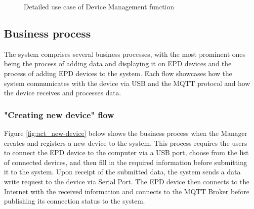 \documentclass[../Main.tex]{subfiles}
\begin{document}
\begin{figure}[H]
    \centering
    \caption{Detailed use case of Device Management function}
    \label{fig:uc_device}
\end{figure}

\subsection{Business process}
\label{subsection:2.2.3}
The system comprises several business processes, with the most prominent ones being the process of adding data and displaying it on EPD devices and the process of adding EPD devices to the system. Each flow showcases how the system communicates with the device via USB and the MQTT protocol and how the device receives and processes data.

\subsubsection{"Creating new device" flow}
Figure \ref{fig:act_new-device} below shows the business process when the Manager creates and registers a new device to the system. This process requires the users to connect the EPD device to the computer via a USB port, choose from the list of connected devices, and then fill in the required information before submitting it to the system. Upon receipt of the submitted data, the system sends a data write request to the device via Serial Port. The EPD device then connects to the Internet with the received information and connects to the MQTT Broker before publishing its connection status to the system.
\end{document}

